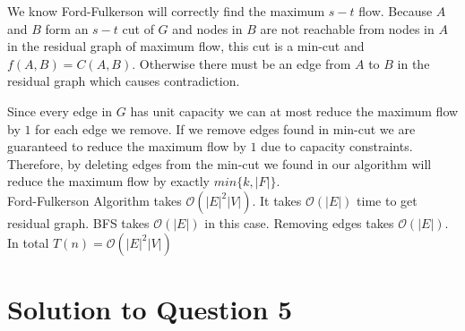 \documentclass[11pt]{article}
\renewcommand{\O}{\mathcal{O}}
\begin{document}

We know Ford-Fulkerson will correctly find the maximum $s-t$ flow. Because $A$ and $B$ form an $s-t$ cut of $G$ and nodes in $B$ are not reachable from nodes in $A$ in the residual graph of maximum flow, this cut is a min-cut and $f(A, B) = C(A, B)$. Otherwise there must be an edge from $A$ to $B$ in the residual graph which causes contradiction.

Since every edge in $G$ has unit capacity we can at most reduce the maximum flow by $1$ for each edge we remove. If we remove edges found in min-cut we are guaranteed to reduce the maximum flow by $1$ due to capacity constraints. Therefore, by deleting edges from the min-cut we found in our algorithm will reduce the maximum flow by exactly $min\{k, |F|\}$.\\

 Ford-Fulkerson Algorithm takes $\O(|E|^2|V|)$. It takes $\O(|E|)$ time to get residual graph. BFS takes $\O(|E|)$ in this case. Removing edges takes $\O(|E|)$. In total $T(n) = \O(|E|^2|V|)$

\newpage
\section{Solution to Question 5} 
{}
\end{document}
